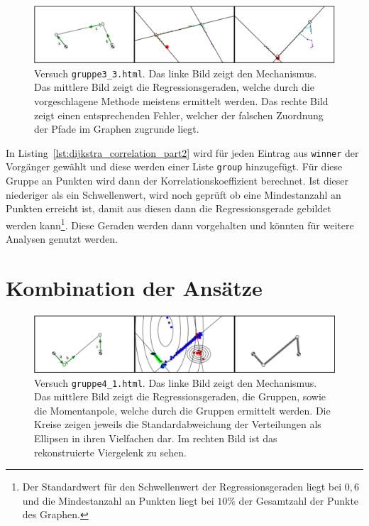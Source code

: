 \begin{figure}
    \centering
    \includegraphics[width=\textwidth]{gfx/correlation_edit.png}
    \caption[Versuch \lstinline{gruppe3_3.html}]{Versuch \lstinline{gruppe3_3.html}. Das linke Bild zeigt den Mechanismus. Das mittlere Bild zeigt die Regressionsgeraden, welche durch die vorgeschlagene Methode meistens ermittelt werden. Das rechte Bild zeigt einen entsprechenden Fehler, welcher der falschen Zuordnung der Pfade im Graphen zugrunde liegt.}
    \label{fig:gruppe3_3}
\end{figure}

In Listing~\ref{lst:dijkstra_correlation_part2} wird für jeden Eintrag aus \lstinline{winner} der Vorgänger gewählt und diese werden einer Liste \lstinline{group} hinzugefügt.
Für diese Gruppe an Punkten wird dann der Korrelationskoeffizient berechnet.
Ist dieser niederiger als ein Schwellenwert, wird noch geprüft ob eine Mindestanzahl an Punkten erreicht ist, damit aus diesen dann die Regressionsgerade gebildet werden kann\footnote{Der Standardwert für den Schwellenwert der Regressionsgeraden liegt bei $0,6$ und die Mindestanzahl an Punkten liegt bei $10\%$ der Gesamtzahl der Punkte des Graphen.}.
Diese Geraden werden dann vorgehalten und könnten für weitere Analysen genutzt werden.

\section{Kombination der Ansätze}

\begin{figure}
    \centering
    \includegraphics[width=\textwidth]{gfx/gruppe4_1.png}
    \caption[Versuch \lstinline{gruppe4_1.html}]{Versuch \lstinline{gruppe4_1.html}. Das linke Bild zeigt den Mechanismus. Das mittlere Bild zeigt die Regressionsgeraden, die Gruppen, sowie die Momentanpole, welche durch die Gruppen ermittelt werden. Die Kreise zeigen jeweils die Standardabweichung der Verteilungen als Ellipsen in ihren Vielfachen dar. Im rechten Bild ist das rekonstruierte Viergelenk zu sehen.}
    \label{fig:gruppe4_1}
\end{figure}

